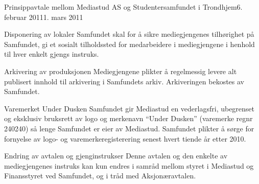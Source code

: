 \documentclass[../fsbok.tex]{subfiles}
\begin{document}
\begin{instruks}{Prinsippavtale mellom Mediastud AS og Studentersamfundet i Trondhjem}{6. februar 2011}{1. mars 2011}
    \begin{instruksledd}{Disponering av lokaler }
        Samfundet skal for å sikre mediegjengenes tilhørighet på Samfundet, gi et sosialt
        tilholdssted for
        medarbeidere i mediegjengene i henhold til hver enkelt gjengs instruks.
    \end{instruksledd}

    \begin{instruksledd}{Arkivering av produksjonen}
        Mediegjengene plikter å regelmessig levere alt publisert innhold til arkivering i
        Samfundets arkiv.  Arkiveringen bekostes av Samfundet.
    \end{instruksledd}
\pagebreak
    \begin{instruksledd}{Varemerket Under Dusken }
        Samfundet gir Mediastud en vederlagsfri, ubegrenset og eksklusiv bruksrett av logo
        og merkenavn
        ``Under Dusken'' (varemerke regnr 240240) så lenge Samfundet er eier av Mediastud.
        Samfundet
        plikter å sørge for fornyelse av logo- og varemerkeregisterering senest hvert
        tiende år etter 2010.
    \end{instruksledd}

    \begin{instruksledd}{ Endring av avtalen og gjenginstrukser } 
        Denne avtalen og den enkelte av mediegjengenes instruks kan kun endres i samråd
        mellom styret i
        Mediastud og Finansstyret ved Samfundet, og i tråd med Aksjonæravtalen.
    \end{instruksledd}

\end{instruks}
\end{document}
